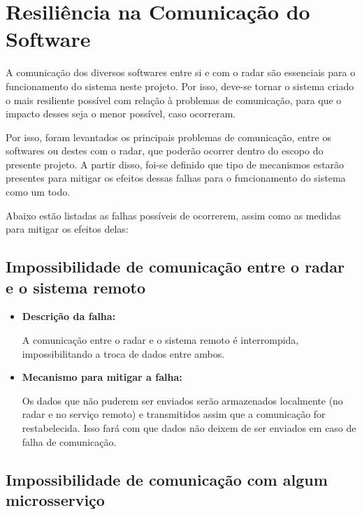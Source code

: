 \section{Resiliência na Comunicação do Software}

A comunicação dos diversos softwares entre si e com o radar são essenciais para o funcionamento do sistema neste projeto. Por isso, deve-se tornar o sistema criado o mais resiliente possível com relação à problemas de comunicação, para que o impacto desses seja o menor possível, caso ocorreram.

Por isso, foram levantados os principais problemas de comunicação, entre os softwares ou destes com o radar, que poderão ocorrer dentro do escopo do presente projeto. A partir disso, foi-se definido que tipo de mecanismos estarão presentes para mitigar os efeitos dessas falhas para o funcionamento do sistema como um todo.

Abaixo estão listadas as falhas possíveis de ocorrerem, assim como as medidas para mitigar os efeitos delas:

\subsection{Impossibilidade de comunicação entre o radar e o sistema remoto}

\begin{itemize}
    \item \textbf{Descrição da falha:}
    
    A comunicação entre o radar e o sistema remoto é interrompida, impossibilitando a troca de dados entre ambos.
    
    \item \textbf{Mecanismo para mitigar a falha:}
    
    Os dados que não puderem ser enviados serão armazenados localmente (no radar e no serviço remoto) e transmitidos assim que a comunicação for restabelecida. Isso fará com que dados não deixem de ser enviados em caso de falha de comunicação.
\end{itemize}

\subsection{Impossibilidade de comunicação com algum microsserviço}

